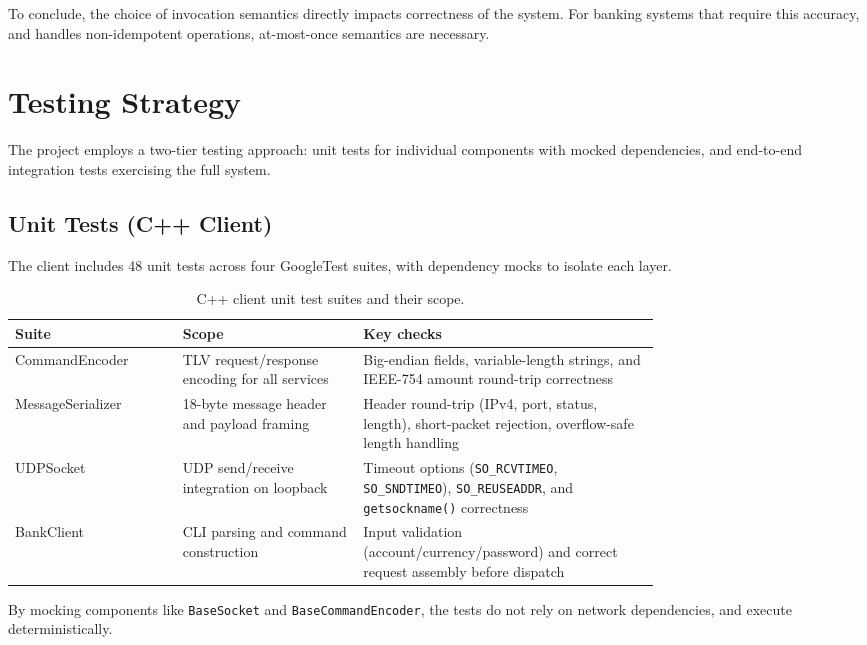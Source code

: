 \documentclass[9pt,a4paper]{article}
\begin{document}
To conclude, the choice of invocation semantics directly impacts correctness of the system. For banking systems that require this accuracy, and handles non-idempotent operations, at-most-once semantics are necessary. 

\section{Testing Strategy}

The project employs a two-tier testing approach: unit tests for individual components with mocked dependencies, and end-to-end integration tests exercising the full system.

\subsection{Unit Tests (C++ Client)}

The client includes 48 unit tests across four GoogleTest suites, with dependency mocks to isolate each layer.

\begin{table}[H]
\centering
\caption{C++ client unit test suites and their scope.}
\label{tab:unit-test-suites}
\begin{tabular}{l p{0.29\linewidth} p{0.46\linewidth}}
\toprule
\textbf{Suite} & \textbf{Scope} & \textbf{Key checks} \\
\midrule
CommandEncoder & TLV request/response encoding for all services & Big-endian fields, variable-length strings, and IEEE-754 amount round-trip correctness \\
MessageSerializer & 18-byte message header and payload framing & Header round-trip (IPv4, port, status, length), short-packet rejection, overflow-safe length handling \\
UDPSocket & UDP send/receive integration on loopback & Timeout options (\texttt{SO\_RCVTIMEO}, \texttt{SO\_SNDTIMEO}), \texttt{SO\_REUSEADDR}, and \texttt{getsockname()} correctness \\
BankClient & CLI parsing and command construction & Input validation (account/currency/password) and correct request assembly before dispatch \\
\bottomrule
\end{tabular}
\end{table}

By mocking components like \texttt{BaseSocket} and \texttt{BaseCommandEncoder}, the tests do not rely on network dependencies, and execute deterministically.
\end{document}
